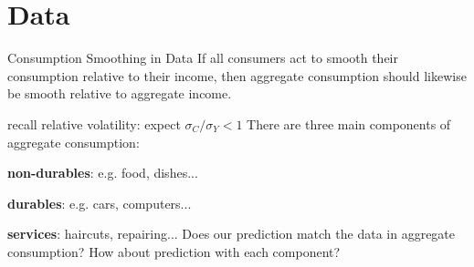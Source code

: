 \documentclass[11pt,aspectratio=169,usenames,dvipsnames]{beamer}
\let\tempone\itemize
\let\temptwo\enditemize
\renewenvironment{itemize}{\tempone\addtolength{\itemsep}{\fill}}{\temptwo}
\let\tempa\enumerate
\let\tempb\endenumerate
\renewenvironment{enumerate}{\tempa\addtolength{\itemsep}{\fill}}{\tempb}
\begin{document}
\section{Data}
\label{sec:Data}

\begin{frame}{Consumption Smoothing in Data}
\label{slide:Consumption_Smoothing_in_Data}
    If all consumers act to smooth their consumption relative to their income, then
\alert{aggregate consumption} should likewise be smooth relative to \alert{aggregate income}.
    \begin{itemize}
        \item recall relative volatility: expect $ \sigma_{C}/\sigma_{Y} < 1 $
    \end{itemize}
    There are three main components of aggregate consumption:
    \begin{enumerate}
        \item \textbf{non-durables}: e.g. food, dishes...
        \item \textbf{durables}: e.g. cars, computers...
        \item \textbf{services}: haircuts, repairing...
    \end{enumerate}
    Does our prediction match the data in aggregate consumption? How about prediction with each component?
\end{frame}
\end{document}
